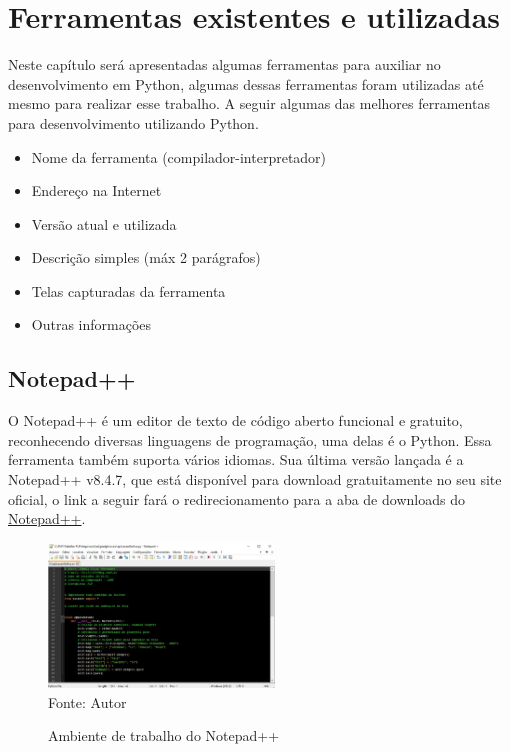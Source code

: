 

\chapter{Ferramentas existentes e utilizadas}

Neste capítulo será apresentadas algumas ferramentas para auxiliar no desenvolvimento em Python, algumas dessas ferramentas foram utilizadas até mesmo para realizar esse trabalho. A seguir algumas das melhores ferramentas para desenvolvimento utilizando Python.
\begin{itemize}
  \item Nome da ferramenta (compilador-interpretador)
  \item Endere\c{c}o na Internet
  \item Vers\~{a}o atual e utilizada
  \item Descri\c{c}\~{a}o simples (m\'{a}x 2 par\'{a}grafos)
  \item Telas capturadas da ferramenta
  \item Outras informa\c{c}\~{o}es
\end{itemize}

    \section{Notepad++}
	O Notepad++ é um editor de texto de código aberto funcional e gratuito, reconhecendo diversas linguagens de programação, uma delas é o Python. Essa ferramenta também suporta vários idiomas. Sua última versão lançada é a Notepad++ v8.4.7, que está disponível para download gratuitamente no seu site oficial, o link a seguir fará o redirecionamento para a aba de downloads do \href{https://notepad-plus-plus.org/downloads/}{Notepad++}. 
	
	\begin{figure}[H]
		\begin{center}
			\caption{Ambiente de trabalho do Notepad++} \label{ling1}
			\includegraphics[width=6cm]{notepad.JPG} \\
			{\tiny \sf Fonte:{ Autor}}
		\end{center}
	\end{figure}
	
